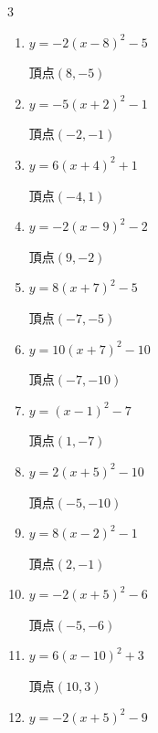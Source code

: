 \begin{multicols}{3}
\begin{enumerate}
  \item $\displaystyle y=-2\left( x-8\right)^{2}-5$

        $\displaystyle 頂点\left( 8 , -5 \right)$

  \item $\displaystyle y=-5\left( x+2\right)^{2}-1$

        $\displaystyle 頂点\left( -2 , -1 \right)$

  \item $\displaystyle y=6\left( x+4\right)^{2}+1$

        $\displaystyle 頂点\left( -4 , 1 \right)$

  \item $\displaystyle y=-2\left( x-9\right)^{2}-2$

        $\displaystyle 頂点\left( 9 , -2 \right)$

  \item $\displaystyle y=8\left( x+7\right)^{2}-5$

        $\displaystyle 頂点\left( -7 , -5 \right)$

\columnbreak %

  \item $\displaystyle y=10\left( x+7\right)^{2}-10$

        $\displaystyle 頂点\left( -7 , -10 \right)$

  \item $\displaystyle y=\left( x-1\right)^{2}-7$

        $\displaystyle 頂点\left( 1 , -7 \right)$

  \item $\displaystyle y=2\left( x+5\right)^{2}-10$

        $\displaystyle 頂点\left( -5 , -10 \right)$

  \item $\displaystyle y=8\left( x-2\right)^{2}-1$

        $\displaystyle 頂点\left( 2 , -1 \right)$

  \item $\displaystyle y=-2\left( x+5\right)^{2}-6$

        $\displaystyle 頂点\left( -5 , -6 \right)$

  \item $\displaystyle y=6\left( x-10\right)^{2}+3$

        $\displaystyle 頂点\left( 10 , 3 \right)$

  \item $\displaystyle y=-2\left( x+5\right)^{2}-9$


\end{enumerate}
\end{multicols}
